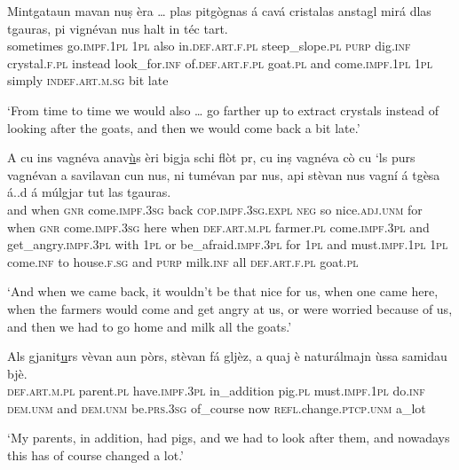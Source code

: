 \begin{linenumbers}
\gll    Mintgataun mavan nuṣ èra … plas pitgògnas á cavá cristalas anstagl mirá dlas tgauras, pi vignévan nus halt in téc tart. \\
sometimes go.\textsc{impf.1pl} \textsc{1pl} also {} in.\textsc{def.art.f.pl} steep\_slope.\textsc{pl} \textsc{purp} dig.\textsc{inf} crystal.\textsc{f.pl} instead look\_for.\textsc{inf} of.\textsc{def.art.f.pl} goat.\textsc{pl} and come.\textsc{impf.1pl} \textsc{1pl} simply \textsc{indef.art.m.sg} bit late \\
\end{linenumbers}
\medskip
\glt `From time to time we would also … go farther up to extract crystals instead of looking after the goats, and then we would come back a bit late.'
\medskip

\begin{linenumbers}
\gll    A cu ins vagnéva anav\underline{ù}s èri bigja schi flòt pr, cu inṣ vagnéva cò cu `ls purs vagnévan a savilavan cun nus, ni tumévan par nus, api stèvan nus vagní á tgèsa á..d á múlgjar tut las tgauras.\\
and when \textsc{gnr} come.\textsc{impf.3sg} back \textsc{cop.impf.3sg.expl} \textsc{neg} so nice.\textsc{adj.unm} for when \textsc{gnr} come.\textsc{impf.3sg} here when \textsc{def.art.m.pl} farmer.\textsc{pl} come.\textsc{impf.3pl} and get\_angry.\textsc{impf.3pl} with \textsc{1pl} or be\_afraid.\textsc{impf.3pl} for \textsc{1pl} and must.\textsc{impf.1pl} \textsc{1pl} come.\textsc{inf} to house.\textsc{f.sg} and \textsc{purp} milk.\textsc{inf} all \textsc{def.art.f.pl} goat.\textsc{pl}\\
\end{linenumbers}
\medskip
\glt `And when we came back, it wouldn’t be that nice for us, when one came here, when the farmers would come and get angry at us, or were worried because of us, and then we had to go home and milk all the goats.'
\medskip

\begin{linenumbers}
\gll Als gjanit\underline{u}rs vèvan aun pòrs, stèvan fá gljèz, a quaj è naturálmajn ùssa samidau bjè. \\
 \textsc{def.art.m.pl} parent.\textsc{pl} have.\textsc{impf.3pl} in\_addition pig.\textsc{pl} must.\textsc{impf.1pl} do.\textsc{inf} \textsc{dem.unm} and \textsc{dem.unm} be.\textsc{prs.3sg} of\_course now \textsc{refl.}change.\textsc{ptcp.unm} a\_lot\\
\end{linenumbers}
\medskip
\glt `My parents, in addition, had pigs, and we had to look after them, and nowadays this has of course changed a lot.'
\medskip


